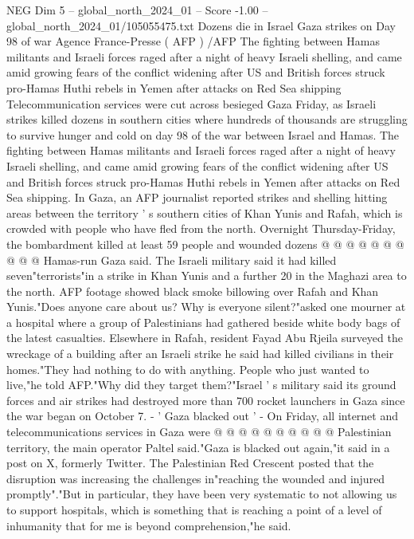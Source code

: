 \begin{textsample}{NEG Dim 5 – global\_north\_2024\_01 – Score -1.00 – global\_north\_2024\_01/105055475.txt}  \label{ex:f5_neg_311}
Dozens die in Israel Gaza strikes on Day 98 of war Agence France-Presse ( AFP ) /AFP The fighting between Hamas militants and Israeli forces raged after a night of heavy Israeli shelling, and came amid growing fears of the conflict widening after US and British forces struck pro-Hamas Huthi rebels in Yemen after attacks on Red Sea shipping Telecommunication services were cut across besieged Gaza Friday, as Israeli strikes killed dozens in southern cities where hundreds of thousands are struggling to survive hunger and cold on day 98 of the war between Israel and Hamas.
The fighting between Hamas militants and Israeli forces raged after a night of heavy Israeli shelling, and came amid growing fears of the conflict widening after US and British forces struck pro-Hamas Huthi rebels in Yemen after attacks on Red Sea shipping.
In Gaza, an AFP journalist reported strikes and shelling hitting areas between the territory ' s southern cities of Khan Yunis and Rafah, which is crowded with people who have fled from the north.
Overnight Thursday-Friday, the bombardment killed at least 59 people and wounded dozens @ @ @ @ @ @ @ @ @ @ Hamas-run Gaza said.
The Israeli military said it had killed seven"terrorists"in a strike in Khan Yunis and a further 20 in the Maghazi area to the north.
AFP footage showed black smoke billowing over Rafah and Khan Yunis."Does anyone care about us?
Why is everyone silent?"asked one mourner at a hospital where a group of Palestinians had gathered beside white body bags of the latest casualties.
Elsewhere in Rafah, resident Fayad Abu Rjeila surveyed the wreckage of a building after an Israeli strike he said had killed civilians in their homes."They had nothing to do with anything.
People who just wanted to live,"he told AFP."Why did they target them?"Israel ' s military said its ground forces and air strikes had destroyed more than 700 rocket launchers in Gaza since the war began on October 7. - ' Gaza blacked out ' - On Friday, all internet and telecommunications services in Gaza were @ @ @ @ @ @ @ @ @ @ Palestinian territory, the main operator Paltel said."Gaza is blacked out again,"it said in a post on X, formerly Twitter.
The Palestinian Red Crescent posted that the disruption was increasing the challenges in"reaching the wounded and injured promptly"."But in particular, they have been very systematic to not allowing us to support hospitals, which is something that is reaching a point of a level of inhumanity that for me is beyond comprehension,"he said.

\end{textsample}
